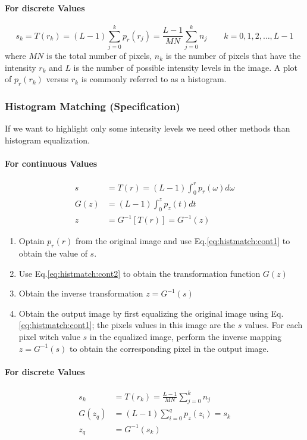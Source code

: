 \paragraph{For discrete Values}
\begin{equation}
	s_k = T(r_k) = (L-1) \sum_{j=0}^k p_r(r_j) = \frac{L-1}{MN} \sum_{j=0}^k n_j \qquad k = 0,1,2,\ldots, L-1
\end{equation}
where $MN$ is the total number of pixels, $n_k$ is the number of pixels that have the intensity $r_k$ and $L$ is the number of possible intensity levels in the image.
A plot of $p_r(r_k)$ versus $r_k$ is commonly referred to as a histogram.


\subsubsection{Histogram Matching (Specification)}
If we want to highlight only some intensity levels we need other methods than histogram equalization.

\paragraph{For continuous Values}
\begin{align}
	s	&= T(r) = (L-1) \int_0^r p_r(\omega) d\omega \label{eq:histmatch:cont1} \\
	G(z)&= (L-1) \int_0^z p_z(t) dt \label{eq:histmatch:cont2} \\
	z 	&= G^{-1}[T(r)] = G^{-1}(z) \label{eq:histmatch:cont3}
\end{align}

\begin{enumerate}
  \item Optain $p_r(r)$ from the original image and use Eq.\ref{eq:histmatch:cont1} to obtain the value of $s$.
  \item Use Eq.\ref{eq:histmatch:cont2} to obtain the transformation function $G(z)$
  \item Obtain the inverse transformation $z = G^{-1}(s)$
  \item Obtain the output image by first equalizing the original image using Eq.\ref{eq:histmatch:cont1}; the pixels values in this image are the $s$ values.
  	For each pixel witch value $s$ in the equalized image, perform the inverse mapping $z = G^{-1}(s)$ to obtain the corresponding pixel in the output image. 
\end{enumerate}

\paragraph{For discrete Values}
\begin{align}
	s_k		&= T(r_k) = \frac{L-1}{MN}\sum_{j=0}^{k} n_j \label{eq:histmatch:disc1} \\
	G(z_q)	&= (L-1) \sum_{i=0}^q p_z(z_i) = s_k \label{eq:histmatch:disc2}  \\
	z_q 	&= G^{-1}(s_k)	 
\end{align}

